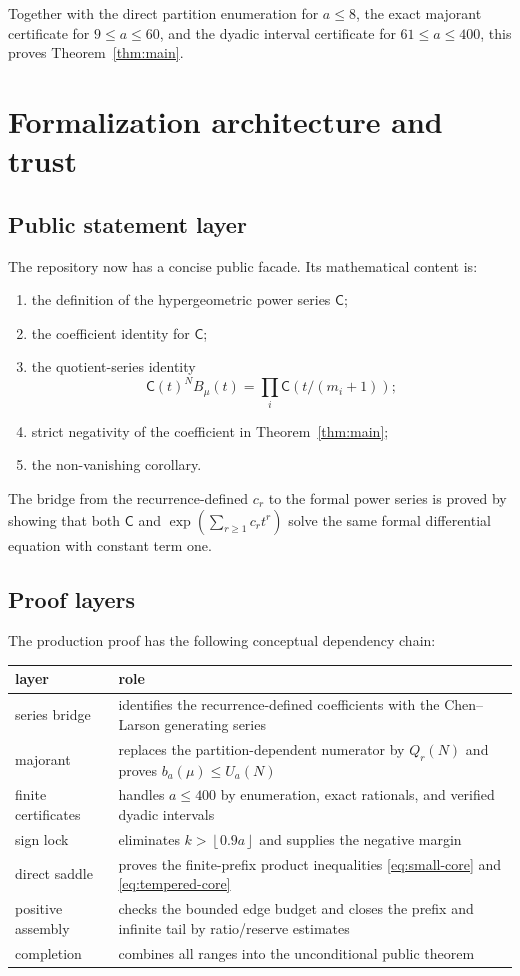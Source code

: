 \documentclass[11pt]{article}
\theoremstyle{definition}
\theoremstyle{remark}
\newcommand{\C}{\mathsf C}
\newcommand{\floor}[1]{\left\lfloor #1\right\rfloor}
\begin{document}
Together with the direct partition enumeration for $a\le8$, the exact
majorant certificate for $9\le a\le60$, and the dyadic interval certificate
for $61\le a\le400$, this proves Theorem~\ref{thm:main}.

\section{Formalization architecture and trust}\label{sec:formalization}

\subsection{Public statement layer}

The repository now has a concise public facade.  Its mathematical content is:
\begin{enumerate}[leftmargin=2em]
  \item the definition of the hypergeometric power series $\C$;
  \item the coefficient identity for $\C$;
  \item the quotient-series identity
  \[
    \C(t)^N B_\mu(t)=\prod_i\C(t/(m_i+1));
  \]
  \item strict negativity of the coefficient in Theorem~\ref{thm:main};
  \item the non-vanishing corollary.
\end{enumerate}
The bridge from the recurrence-defined $c_r$ to the formal power series is
proved by showing that both $\C$ and
$\exp(\sum_{r\ge1}c_rt^r)$ solve the same formal differential equation with
constant term one.

\subsection{Proof layers}

The production proof has the following conceptual dependency chain:
\begin{center}
\begin{tabular}{p{}p{}}
\toprule
layer & role\\
\midrule
series bridge & identifies the recurrence-defined coefficients with the
  Chen--Larson generating series\\
majorant & replaces the partition-dependent numerator by $Q_r(N)$ and proves
  $b_a(\mu)\le U_a(N)$\\
finite certificates & handles $a\le400$ by enumeration, exact rationals, and
  verified dyadic intervals\\
sign lock & eliminates $k>\floor{0.9a}$ and supplies the negative margin\\
direct saddle & proves the finite-prefix product inequalities
  \eqref{eq:small-core} and \eqref{eq:tempered-core}\\
positive assembly & checks the bounded edge budget and closes the prefix and
  infinite tail by ratio/reserve estimates\\
completion & combines all ranges into the unconditional public theorem\\
\bottomrule
\end{tabular}
\end{center}
\end{document}
